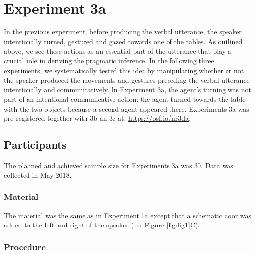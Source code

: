 \documentclass[
  man,floatsintext]{apa6}
\begin{document}
\hypertarget{experiment-3a}{%
\section{Experiment 3a}\label{experiment-3a}}

In the previous experiment, before producing the verbal utterance, the speaker intentionally turned, gestured and gazed towards one of the tables. As outlined above, we see these actions as an essential part of the utterance that play a crucial role in deriving the pragmatic inference. In the following three experiments, we systematically tested this idea by manipulating whether or not the speaker produced the movements and gestures preceding the verbal utterance intentionally and communicatively. In Experiment 3a, the agent's turning was not part of an intentional communicative action: the agent turned towards the table with the two objects because a second agent appeared there. Experiments 3a was pre-registered together with 3b an 3c at: \url{https://osf.io/nr3da}.

\hypertarget{participants-3}{%
\subsection{Participants}\label{participants-3}}

The planned and achieved sample size for Experiments 3a was 30. Data was collected in May 2018.

\hypertarget{material-3}{%
\subsubsection{Material}\label{material-3}}

The material was the same as in Experiment 1a except that a schematic door was added to the left and right of the speaker (see Figure \ref{fig:fig1}C).

\hypertarget{procedure-3}{%
\subsubsection{Procedure}\label{procedure-3}}
\end{document}
